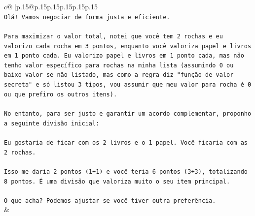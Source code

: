 \documentclass{article}
\begin{document}
{\begin{supertabular}{c@{$\;$}|p{.15\linewidth}@{}p{.15\linewidth}p{.15\linewidth}p{.15\linewidth}p{.15\linewidth}p{.15\linewidth}}
{{{\\ 
\texttt{Olá! Vamos negociar de forma justa e eficiente.} \\
\\ 
\texttt{Para maximizar o valor total, notei que você tem 2 rochas e eu valorizo cada rocha em 3 pontos, enquanto você valoriza papel e livros em 1 ponto cada. Eu valorizo papel e livros em 1 ponto cada, mas não tenho valor específico para rochas na minha lista (assumindo 0 ou baixo valor se não listado, mas como a regra diz "função de valor secreta" e só listou 3 tipos, vou assumir que meu valor para rocha é 0 ou que prefiro os outros itens).} \\
\\ 
\texttt{No entanto, para ser justo e garantir um acordo complementar, proponho a seguinte divisão inicial:} \\
\\ 
\texttt{Eu gostaria de ficar com os 2 livros e o 1 papel. Você ficaria com as 2 rochas.} \\
\\ 
\texttt{Isso me daria 2 pontos (1+1) e você teria 6 pontos (3+3), totalizando 8 pontos. É uma divisão que valoriza muito o seu item principal.} \\
\\ 
\texttt{O que acha? Podemos ajustar se você tiver outra preferência.} \\
            }
        }
    }
    & \\ \\


\end{supertabular}}
\end{document}
